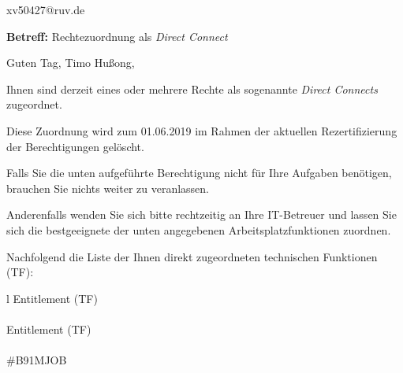 \documentclass[a4paper,landscape,12pt]{letter}
\begin{document}
\begin{letter}{xv50427@ruv.de\hfill \break}
\begin{normalsize}
	\opening{\textbf{Betreff:} Rechtezuordnung als \emph{Direct Connect}}
	\begin{normalsize} \hfill
	\end{normalsize}

	\begin{normalsize}
		Guten Tag, 
	Timo Hußong, \hfill \break
	\end{normalsize}
	\end{normalsize}
	
\begin{normalsize}
	Ihnen sind derzeit eines oder mehrere Rechte als sogenannte \emph{Direct Connects} zugeordnet.
	
	Diese Zuordnung wird zum 01.06.2019 im Rahmen der aktuellen Rezertifizierung der Berechtigungen gelöscht.
	
	Falls Sie die unten aufgeführte Berechtigung nicht für Ihre Aufgaben benötigen, 
	brauchen Sie nichts weiter zu veranlassen.
	
	Anderenfalls wenden Sie sich bitte rechtzeitig an Ihre IT-Betreuer 
	und lassen Sie sich die bestgeeignete der unten angegebenen Arbeitsplatzfunktionen zuordnen.
	\end{normalsize}
	
\begin{normalsize}
	Nachfolgend die Liste der Ihnen direkt zugeordneten technischen Funktionen (TF):

	\begin{longtable}{l}
		Entitlement (TF) \\ \hline
		\endfirsthead
		\\\hline
		Entitlement (TF) \\ \hline
		\endhead %
		\multicolumn{1}{r@{}}{Fortsetzung \ldots}\\
		\endfoot
		\hline
		\endlastfoot
	\#B91MJOB\\
	\end{longtable}
	\end{normalsize}
	

\end{letter}
\end{document}
